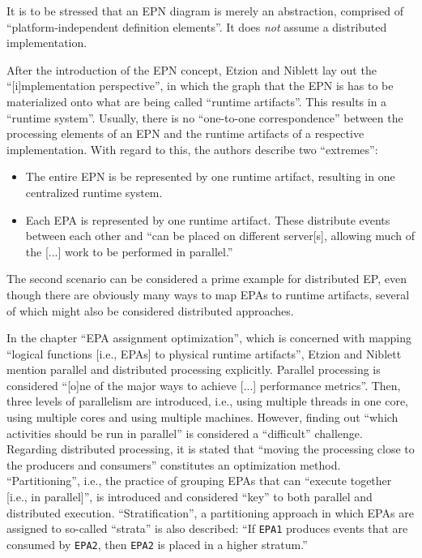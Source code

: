 \documentclass[article, 10pt, type=bsc, colorback, accentcolor=tud8b, parskip=half, bibliography=totocnumbered]{tudthesis}
\begin{document}
It is to be stressed that an EPN diagram is merely an abstraction, comprised of ``platform-independent definition elements''.
It does \emph{not} assume a distributed implementation.

After the introduction of the EPN concept, Etzion and Niblett \cite{Etzion:2010:EPA:1894960} lay out the ``[i]mplementation perspective'', in which the graph that the EPN is has to be materialized onto what are being called ``runtime artifacts''.
This results in a ``runtime system''.
Usually, there is no ``one-to-one correspondence'' between the processing elements of an EPN and the runtime artifacts of a respective implementation.
With regard to this, the authors describe two ``extremes'':

\begin{itemize}
\item
The entire EPN is be represented by one runtime artifact, resulting in one centralized runtime system.
\item
Each EPA is represented by one runtime artifact.
These distribute events between each other and ``can be placed on different server[s], allowing much of the [...] work to be performed in parallel.''
\end{itemize}

The second scenario can be considered a prime example for distributed EP, even though there are obviously many ways to map EPAs to runtime artifacts, several of which might also be considered distributed approaches.

In the chapter ``EPA assignment optimization'', which is concerned with mapping ``logical functions [i.e., EPAs] to physical runtime artifacts'', Etzion and Niblett \cite{Etzion:2010:EPA:1894960} mention parallel and distributed processing explicitly.
Parallel processing is considered ``[o]ne of the major ways to achieve [...] performance metrics''.
Then, three levels of parallelism are introduced, i.e., using multiple threads in one core, using multiple cores and using multiple machines.
However, finding out ``which activities should be run in parallel'' is considered a ``difficult'' challenge.
Regarding distributed processing, it is stated that ``moving the processing close to the producers and consumers'' constitutes an optimization method.
``Partitioning'', i.e., the practice of grouping EPAs that can ``execute together [i.e., in parallel]'', is introduced and considered ``key'' to both parallel and distributed execution.
``Stratification'', a partitioning approach in which EPAs are assigned to so-called ``strata'' is also described: ``If \lstinline{EPA1} produces events that are consumed by \lstinline{EPA2}, then \lstinline{EPA2} is placed in a higher stratum.''
\end{document}
